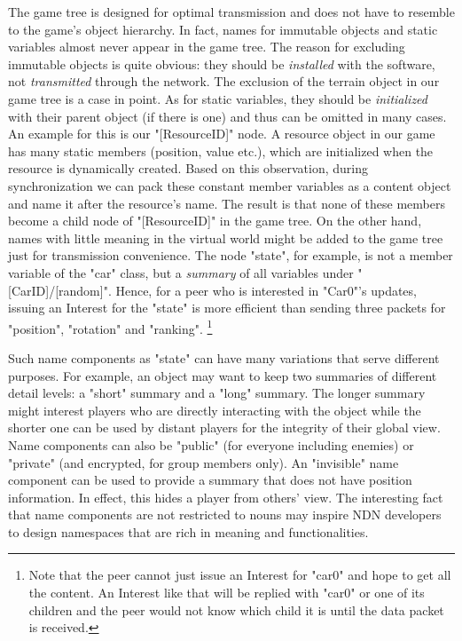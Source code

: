 The game tree is designed for optimal transmission and does not have to resemble to the game's object hierarchy. In fact, names for immutable objects and static variables almost never appear in the game tree. The reason for excluding immutable objects is quite obvious: they should be \emph{installed} with the software, not \emph{transmitted} through the network. The exclusion of the terrain object in our game tree is a case in point. As for static variables, they should be \emph{initialized} with their parent object (if there is one) and thus can be omitted in many cases. An example for this is our "{[ResourceID]}" node. A resource object in our game has many static members (position, value etc.), which are initialized when the resource is dynamically created. Based on this observation, during synchronization we can pack these constant member variables as a content object and name it after the resource's name. The result is that none of these members become a child node of "{[ResourceID]}" in the game tree. On the other hand, names with little meaning in the virtual world might be added to the game tree just for transmission convenience. The node "{state}", for example, is not a member variable of the "{car}" class, but a \emph{summary} of all variables under "{[CarID]/[random]}". 
Hence, for a peer who is interested in "{Car0}"'s updates, issuing an Interest for the "{state}" is more efficient than sending three packets for "{position}", "{rotation}" and "{ranking}".
\footnote{Note that the peer cannot just issue an Interest for "{car0}" and hope to get all the content. An Interest like that will be replied with "{car0}" or one of its children and the peer would not know which child it is until the data packet is received.}

Such name components as "{state}" can have many variations that serve different purposes. For example, an object may want to keep two summaries of different detail levels: a "{short}" summary and a "{long}" summary. The longer summary might interest players who are directly interacting with the object while the shorter one can be used by distant players for the integrity of their global view. Name components can also be "{public}" (for everyone including enemies) or "{private}" (and encrypted, for group members only). An "{invisible}" name component can be used to provide a summary that does not have position information. In effect, this hides a player from others' view. The interesting fact that name components are not restricted to nouns may inspire NDN developers to design namespaces that are rich in meaning and functionalities.

